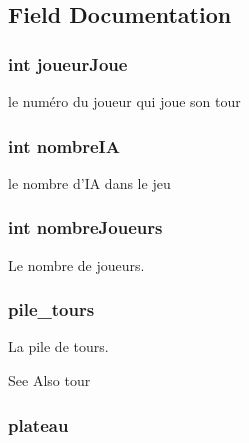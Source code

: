 \subsection{Field Documentation}
\hypertarget{struct_modele_a99d0d68865bfab3c617eec56d5c07f40}{
\subsubsection[{joueur\-Joue}]{\setlength{\rightskip}{0pt plus 5cm}int joueur\-Joue}}\label{struct_modele_a99d0d68865bfab3c617eec56d5c07f40}


le numéro du joueur qui joue son tour 

\hypertarget{struct_modele_a9bd6d0553f9653fd91976d0931e5de01}{
\subsubsection[{nombre\-I\-A}]{\setlength{\rightskip}{0pt plus 5cm}int nombre\-I\-A}}\label{struct_modele_a9bd6d0553f9653fd91976d0931e5de01}


le nombre d'I\-A dans le jeu 

\hypertarget{struct_modele_a8ec31041fec4c54afd404998e104d0f9}{
\subsubsection[{nombre\-Joueurs}]{\setlength{\rightskip}{0pt plus 5cm}int nombre\-Joueurs}}\label{struct_modele_a8ec31041fec4c54afd404998e104d0f9}


Le nombre de joueurs. 

\hypertarget{struct_modele_a2c13602dcbaf121a0fe73a479d84fdf7}{
\subsubsection[{pile\-\_\-tours}]{ pile\-\_\-tours}}\label{struct_modele_a2c13602dcbaf121a0fe73a479d84fdf7}


La pile de tours. 

\begin{DoxySeeAlso}{See Also}
tour 
\end{DoxySeeAlso}
\hypertarget{struct_modele_a274d642eb6fb8198fe001160fd7d3f8a}{
\subsubsection[{plateau}]{ plateau}}\label{struct_modele_a274d642eb6fb8198fe001160fd7d3f8a}



